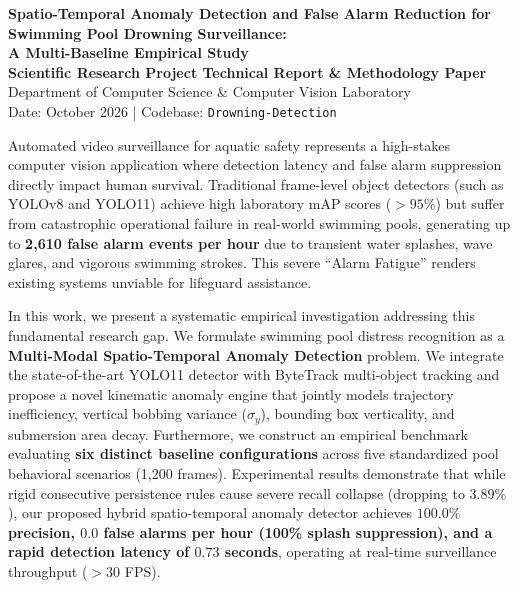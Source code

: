 \documentclass[a4paper,11pt]{article}
\begin{document}
\begin{center}
    {\LARGE \textbf{\color{primaryblue} Spatio-Temporal Anomaly Detection and False Alarm Reduction for Swimming Pool Drowning Surveillance: \\ A Multi-Baseline Empirical Study}} \\[12pt]
    
    {\large \textbf{Scientific Research Project Technical Report \& Methodology Paper}} \\[6pt]
    {\normalsize Department of Computer Science \& Computer Vision Laboratory} \\[4pt]
    {\small Date: October 2026 \quad | \quad Codebase: \texttt{Drowning-Detection}}
\end{center}

\vspace{10pt}

\begin{tcolorbox}[colback=lightbg, colframe=primaryblue, arc=3mm, title=\textbf{Abstract}]
Automated video surveillance for aquatic safety represents a high-stakes computer vision application where detection latency and false alarm suppression directly impact human survival. Traditional frame-level object detectors (such as YOLOv8 and YOLO11) achieve high laboratory mAP scores ($>95\%$) but suffer from catastrophic operational failure in real-world swimming pools, generating up to \textbf{2,610 false alarm events per hour} due to transient water splashes, wave glares, and vigorous swimming strokes. This severe ``Alarm Fatigue'' renders existing systems unviable for lifeguard assistance. 

In this work, we present a systematic empirical investigation addressing this fundamental research gap. We formulate swimming pool distress recognition as a \textbf{Multi-Modal Spatio-Temporal Anomaly Detection} problem. We integrate the state-of-the-art YOLO11 detector with ByteTrack multi-object tracking and propose a novel kinematic anomaly engine that jointly models trajectory inefficiency, vertical bobbing variance ($\sigma_y$), bounding box verticality, and submersion area decay. Furthermore, we construct an empirical benchmark evaluating \textbf{six distinct baseline configurations} across five standardized pool behavioral scenarios (1,200 frames). Experimental results demonstrate that while rigid consecutive persistence rules cause severe recall collapse (dropping to $3.89\%$), our proposed hybrid spatio-temporal anomaly detector achieves \textbf{$100.0\%$ precision, $0.0$ false alarms per hour (100\% splash suppression), and a rapid detection latency of $0.73$ seconds}, operating at real-time surveillance throughput ($>30$ FPS).
\end{tcolorbox}
\end{document}
